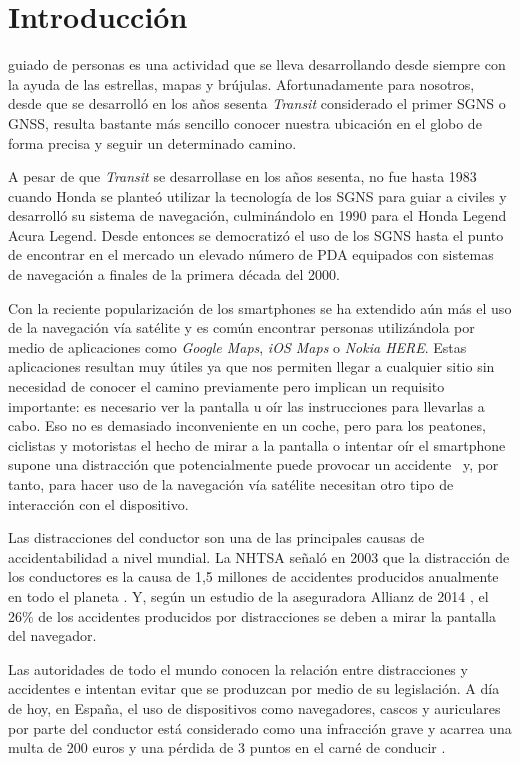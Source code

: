 \chapter{Introducción}
\label{chap:intro}

 guiado de personas es una actividad que se lleva desarrollando desde siempre con la
ayuda de las estrellas, mapas y brújulas. Afortunadamente para nosotros, desde que se desarrolló en
los años sesenta \textit{Transit} considerado el primer \acf{SGNS} o \acf{GNSS}, resulta bastante
más sencillo conocer nuestra ubicación en el globo de forma precisa y seguir un determinado camino.

A pesar de que \textit{Transit} se desarrollase en los años sesenta, no fue hasta 1983 cuando Honda
se planteó utilizar la tecnología de los \acs{SGNS} para guiar a civiles y desarrolló su sistema de
navegación, culminándolo en 1990 para el Honda Legend Acura Legend. Desde entonces se democratizó el
uso de los \acs{SGNS} hasta el punto de encontrar en el mercado un elevado número de \acf{PDA}
equipados con sistemas de navegación a finales de la primera década del 2000.

Con la reciente popularización de los smartphones se ha extendido aún más el uso de la navegación
vía satélite y es común encontrar personas utilizándola por medio de aplicaciones como
\textit{Google Maps}, \textit{iOS Maps} o \textit{Nokia HERE}. Estas aplicaciones
resultan muy útiles ya que nos permiten llegar a cualquier sitio sin necesidad de conocer el camino
previamente pero implican un requisito importante: es necesario ver la pantalla u oír las
instrucciones para llevarlas a cabo. Eso no es demasiado inconveniente en un coche, pero para los
peatones, ciclistas y motoristas el hecho de mirar a la pantalla o intentar oír el smartphone supone
una distracción que potencialmente puede provocar un accidente~\cite{Valcarcel12} y, por tanto, para
hacer uso de la navegación vía satélite necesitan otro tipo de interacción con el dispositivo.

Las distracciones del conductor son una de las principales causas de accidentabilidad a nivel
mundial. La \acf{NHTSA} señaló en 2003 que la distracción de los conductores es la causa de 1,5
millones de accidentes producidos anualmente en todo el planeta \cite{RACC03}. Y, según un estudio
de la aseguradora Allianz de 2014 \cite{Allianz14}, el 26\% de los accidentes producidos por
distracciones se deben a mirar la pantalla del navegador.

Las autoridades de todo el mundo conocen la relación entre distracciones y accidentes e intentan
evitar que se produzcan por medio de su legislación. A día de hoy, en España, el uso de dispositivos
como navegadores, cascos y auriculares por parte del conductor está considerado como una infracción
grave y acarrea una multa de 200 euros y una pérdida de 3 puntos en el carné de conducir
\cite{Serrano14} .

